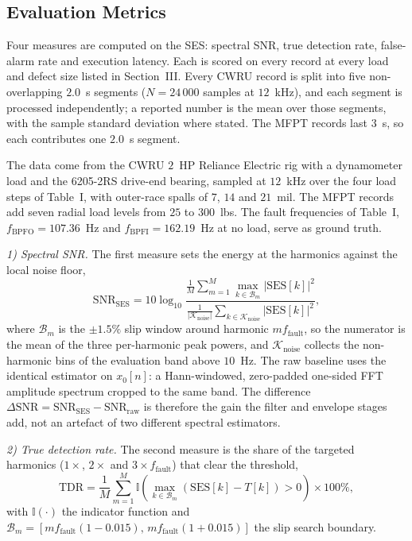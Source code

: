 \subsection{Evaluation Metrics}
Four measures are computed on the SES: spectral SNR, true detection rate,
false-alarm rate and execution latency. Each is scored on every record at every
load and defect size listed in Section~III. Every CWRU record is split into
five non-overlapping $2.0$~s segments ($N=24\,000$ samples at $12$~kHz), and
each segment is processed independently; a reported number is the mean over
those segments, with the sample standard deviation where stated. The MFPT
records last $3$~s, so each contributes one $2.0$~s segment.

The data come from the CWRU $2$~HP Reliance Electric rig with a dynamometer
load and the 6205-2RS drive-end bearing, sampled at $12$~kHz over the four load
steps of Table~I, with outer-race spalls of $7$, $14$ and $21$~mil. The MFPT
records add seven radial load levels from $25$ to $300$~lbs. The fault
frequencies of Table~I, $f_{\text{BPFO}}=107.36$~Hz and
$f_{\text{BPFI}}=162.19$~Hz at no load, serve as ground truth.

\emph{1) Spectral SNR.} The first measure sets the energy at the harmonics
against the local noise floor,
\begin{equation}
  \text{SNR}_{\text{SES}} = 10\log_{10}
  \frac{\frac{1}{M}\sum_{m=1}^{M}
  \max_{k\in\mathcal{B}_m}\left|\text{SES}[k]\right|^{2}}
  {\frac{1}{\left|\mathcal{K}_{\text{noise}}\right|}
  \sum_{k\in\mathcal{K}_{\text{noise}}}\left|\text{SES}[k]\right|^{2}},
  \label{eq:snrses}
\end{equation}
where $\mathcal{B}_m$ is the $\pm1.5\%$ slip window around harmonic
$m f_{\text{fault}}$, so the numerator is the mean of the three per-harmonic
peak powers, and $\mathcal{K}_{\text{noise}}$ collects the non-harmonic bins
of the evaluation band above $10$~Hz. The raw baseline uses the identical
estimator on $x_0[n]$: a Hann-windowed, zero-padded one-sided FFT amplitude
spectrum cropped to the same band. The difference
$\Delta\text{SNR}=\text{SNR}_{\text{SES}}-\text{SNR}_{\text{raw}}$ is therefore
the gain the filter and envelope stages add, not an artefact of two different
spectral estimators.

\emph{2) True detection rate.} The second measure is the share of the targeted
harmonics ($1\times$, $2\times$ and $3\times f_{\text{fault}}$) that clear the
threshold,
\begin{equation}
  \text{TDR} = \frac{1}{M}\sum_{m=1}^{M}
  \mathbb{I}\!\left(\max_{k\in\mathcal{B}_m}
  \left(\text{SES}[k]-T[k]\right) > 0\right)\times100\%,
  \label{eq:tdr}
\end{equation}
with $\mathbb{I}(\cdot)$ the indicator function and
$\mathcal{B}_m=[m f_{\text{fault}}(1-0.015),\,m f_{\text{fault}}(1+0.015)]$ the
slip search boundary.

